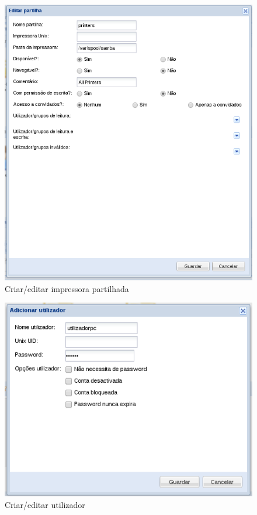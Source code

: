 \begin{figure}[H]
    \begin{center}
    \includegraphics[scale=0.38]{screenshots/etfs/etfs_edit_printer_share.png}
    \caption{Criar/editar impressora partilhada}
    \label{fig:etfs_edit_printer_share}
    \end{center}
\end{figure}

\begin{figure}[H]
    \begin{center}
    \includegraphics[scale=0.38]{screenshots/etfs/etfs_edit_user.png}
    \caption{Criar/editar utilizador}
    \label{fig:etfs_edit_user}
    \end{center}
\end{figure}

